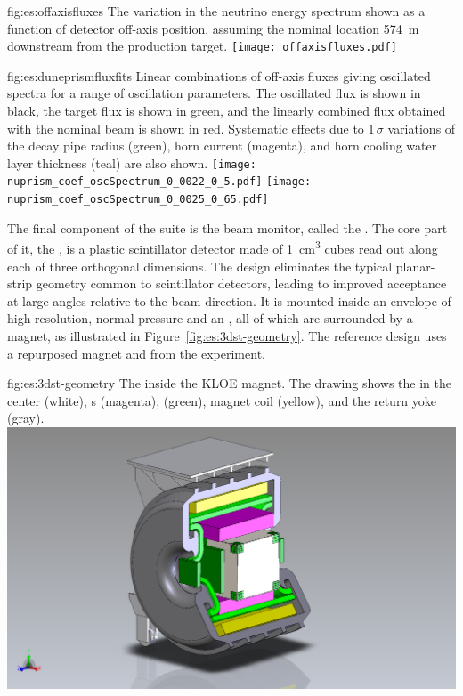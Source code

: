 \begin{dunefigure}{fig:es:offaxisfluxes}
{The variation in the neutrino energy spectrum shown as a function of detector off-axis position, assuming the nominal  location 574~m downstream from the production target.}
\texttt{[image: offaxisfluxes.pdf]}
\end{dunefigure}
\begin{dunefigure}{fig:es:duneprismfluxfits}
{Linear combinations of off-axis fluxes giving  oscillated spectra for a range of oscillation parameters. The   oscillated flux is shown in black, the target flux is shown in green, and the linearly combined flux obtained with the nominal beam  is shown in red. Systematic effects due to 1$\,\sigma$ variations of the decay pipe radius (green), horn current (magenta), and horn cooling water layer thickness (teal) are also shown.}
	\texttt{[image: nuprism\_coef\_oscSpectrum\_0\_0022\_0\_5.pdf]}
	\texttt{[image: nuprism\_coef\_oscSpectrum\_0\_0025\_0\_65.pdf]}
\end{dunefigure}

The final component of the   suite is the beam monitor, called the .  The core part of it, the , is a plastic scintillator detector made of \SI{1}{\cubic\centi\meter} cubes read out along each of three orthogonal dimensions.  The design eliminates the typical planar-strip geometry common to scintillator detectors, leading to improved acceptance at large angles relative to the beam direction. It is mounted  
inside an envelope of high-resolution, normal pressure  and an , all 
of which are surrounded by a magnet, as illustrated in Figure~\ref{fig:es:3dst-geometry}.  The reference design uses a repurposed magnet and  from the  experiment.

\begin{dunefigure}{fig:es:3dst-geometry}
{The  inside the KLOE magnet. The drawing shows the  in the center (white), s (magenta),  (green), magnet coil (yellow), and the return yoke (gray).}
  \includegraphics[width=7.in]{graphics/3DST-KLOE2019-08-01.png}
\end{dunefigure}

